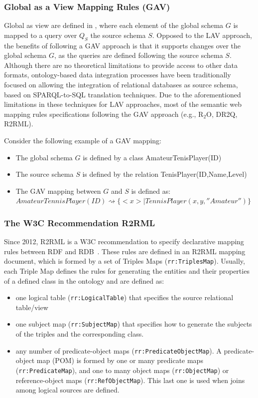 \subsubsection{Global as a View Mapping Rules (GAV)}
Global as view are defined in \citep{halevy2001answering}, where each element of the global schema $G$ is mapped to a query over $Q_S$ the source schema $S$. Opposed to the LAV approach, the benefits of following a GAV approach is that it supports changes over the global schema $G$, as the queries are defined following the source schema $S$. Although there are no theoretical limitations to provide access to other data formats, ontology-based data integration processes have been traditionally focused on allowing the integration of relational databases as source schema, based on SPARQL-to-SQL translation techniques. Due to the aforementioned limitations in these techniques for LAV approaches, most of the semantic web mapping rules specifications following the GAV approach (e.g., R$_2$O, DR2Q, R2RML). 

Consider the following example of a GAV mapping:
\begin{itemize}
    \item The global schema $G$ is defined by a class AmateurTenisPlayer(ID)
    \item The source schema $S$ is defined by the relation TenisPlayer(ID,Name,Level)
    \item The GAV mapping between $G$ and $S$ is defined as:\\
    $AmateurTennisPlayer(ID) \rightsquigarrow \{<x> | TennisPlayer(x,y,''Amateur'')\}$
\end{itemize}

\subsubsection{The W3C Recommendation R2RML}
Since 2012, R2RML is a W3C recommendation to specify declarative mapping rules between RDF and RDB~\citep{R2RML}. These rules are defined in an R2RML mapping document, which is formed by a set of Triples Maps (\texttt{rr:TriplesMap}). Usually, each Triple Map defines the rules for generating the entities and their properties of a defined class in the ontology and are defined as:
\begin{itemize}
    \item one logical table (\texttt{rr:LogicalTable}) that specifies the source relational table/view
    \item one subject map (\texttt{rr:SubjectMap}) that specifies how to generate the subjects of the triples and the corresponding class.
    \item any number of predicate-object maps (\texttt{rr:PredicateObjectMap}). A predicate-object map (POM) is formed by one or many predicate maps (\texttt{rr:PredicateMap}), and one to many object maps (\texttt{rr:ObjectMap}) or reference-object maps (\texttt{rr:RefObjectMap}). This last one is used when joins among logical sources are defined.
\end{itemize}

